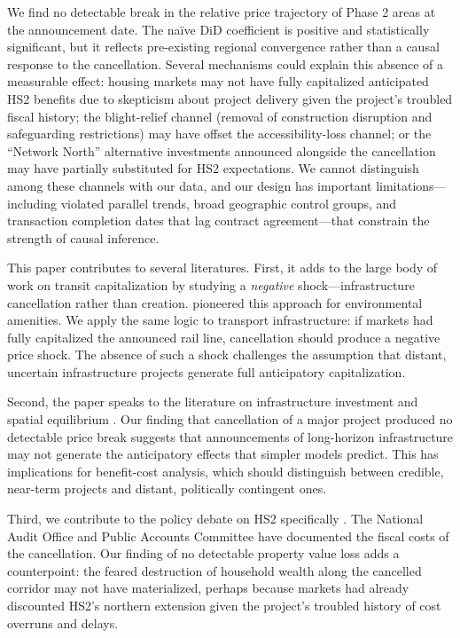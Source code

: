 \documentclass[12pt]{article}
\begin{document}
We find no detectable break in the relative price trajectory of Phase 2 areas at the announcement date. The na\"ive DiD coefficient is positive and statistically significant, but it reflects pre-existing regional convergence rather than a causal response to the cancellation. Several mechanisms could explain this absence of a measurable effect: housing markets may not have fully capitalized anticipated HS2 benefits due to skepticism about project delivery given the project's troubled fiscal history; the blight-relief channel (removal of construction disruption and safeguarding restrictions) may have offset the accessibility-loss channel; or the ``Network North'' alternative investments announced alongside the cancellation may have partially substituted for HS2 expectations. We cannot distinguish among these channels with our data, and our design has important limitations---including violated parallel trends, broad geographic control groups, and transaction completion dates that lag contract agreement---that constrain the strength of causal inference.

This paper contributes to several literatures. First, it adds to the large body of work on transit capitalization \citep{gibbons2005valuing, heblich2024rail, severen2023commuting, gonzalez2019subways} by studying a \textit{negative} shock---infrastructure cancellation rather than creation. \citet{greenstone2008does} pioneered this approach for environmental amenities. We apply the same logic to transport infrastructure: if markets had fully capitalized the announced rail line, cancellation should produce a negative price shock. The absence of such a shock challenges the assumption that distant, uncertain infrastructure projects generate full anticipatory capitalization.

Second, the paper speaks to the literature on infrastructure investment and spatial equilibrium \citep{ahlfeldt2015economics, redding2017quantitative, donaldson2018railroads, baum2007did, duranton2012urban}. Our finding that cancellation of a major project produced no detectable price break suggests that announcements of long-horizon infrastructure may not generate the anticipatory effects that simpler models predict. This has implications for benefit-cost analysis, which should distinguish between credible, near-term projects and distant, politically contingent ones.

Third, we contribute to the policy debate on HS2 specifically \citep{nao2024hs2, pac2024hs2}. The National Audit Office and Public Accounts Committee have documented the fiscal costs of the cancellation. Our finding of no detectable property value loss adds a counterpoint: the feared destruction of household wealth along the cancelled corridor may not have materialized, perhaps because markets had already discounted HS2's northern extension given the project's troubled history of cost overruns and delays.
\end{document}
